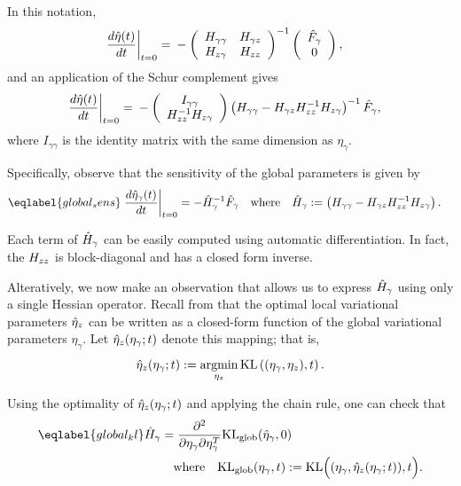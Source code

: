 In this notation,
%
\begin{align*}
%
\fracat{d \etaopt(\t)}{d \t}{t = 0} ={}&
-\left(
\begin{array}{cc}
   \hess{\gamma\gamma} & \hess{\gamma\z} \\
   \hess{\z\gamma}     & \hess{\z\z} \\
\end{array}
\right)^{-1}
\left( \begin{array}{c} \crosshessian_\gamma \\ 0 \end{array}\right),
%
\end{align*}
%
and an application of the Schur complement gives
%
\begin{align*}
%
\fracat{d \etaopt(\t)}{d \t}{t = 0} ={}&
-\left(\begin{array}{c}
I_{\gamma\gamma} \\
\hess{\z\z}^{-1} \hess{\z\gamma}
\end{array}\right)
\left(\hess{\gamma\gamma} -
      \hess{\gamma\z} \hess{\z\z}^{-1} \hess{\z\gamma}\right)^{-1} \crosshessian_\gamma,
%
\end{align*}
where $I_{\gamma\gamma}$ is the identity matrix with
the same dimension as $\eta_\gamma$.

Specifically, observe that the sensitivity of the global parameters
is given by
\begin{align}\eqlabel{global_sens}
  \fracat{d \etaopt_\gamma(\t)}{d \t}{t = 0} &=
  - \hessopt_\gamma^{-1}\crosshessian_\gamma
  \mathwhere
  \hessopt_\gamma := \left(\hess{\gamma\gamma} -
        \hess{\gamma\z} \hess{\z\z}^{-1} \hess{\z\gamma}\right).
\end{align}


Each term of $\hat{H}_\gamma$ can be easily computed using automatic differentiation.
In fact, the $H_{zz}$ is block-diagonal and has a closed form inverse.

Alteratively, we now make an observation that allows us to express $\hat{H}_\gamma$
using only a single Hessian operator.
Recall from  that the optimal local variational parameters $\hat\eta_{z}$ can be written
as a closed-form function of the global variational parameters $\eta_\gamma$.
Let $\hat\eta_{z}(\eta_\gamma; t)$ denote this mapping; that is,
\begin{align*}
  \hat\eta_{z}(\eta_\gamma; t) := \operatorname*{\mathrm{argmin}}_{\eta_z} \mathrm{KL}\left((\eta_\gamma, \eta_z), t\right).
\end{align*}

Using the optimality of $\hat\eta_{z}(\eta_\gamma; t)$ and applying the chain rule, one can check that
\begin{align}\eqlabel{global_kl}
\hessopt_{\gamma} &=
\frac{\partial^2}{\partial\eta_\gamma\partial\eta_\gamma^T}
\KLglobal(\etaopt_\gamma, 0) \\
& \mathwhere
\KLglobal(\eta_\gamma, \t) := \mathrm{KL}\Big((\eta_\gamma, \etaoptz(\eta_\gamma; \t)), \t\Big).
\notag
\end{align}

